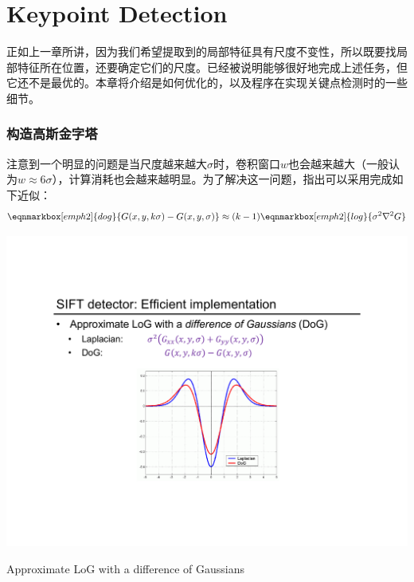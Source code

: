\part{Keypoint Detection}\label{part:Keypoint detection}

正如上一章所讲，因为我们希望提取到的局部特征具有尺度不变性，所以既要找局部特征所在位置，还要确定它们的尺度。\lpl 已经被说明能够很好地完成上述任务，但它还不是最优的。本章将介绍\sift 是如何优化的，以及程序在实现关键点检测时的一些细节。

\section{构造高斯金字塔}

\sift 注意到一个明显的问题是当\lpl 尺度越来越大$\sigma$时，卷积窗口$w$也会越来越大（一般认为$w\approx 6\sigma$），计算消耗也会越来越明显。为了解决这一问题，\sift 指出可以采用\DoG 完成如下近似：
\begin{equation}
	\eqnmarkbox[emph2]{dog}{G(x,y,k\sigma) - G(x,y,\sigma)} \approx (k-1)\eqnmarkbox[emph2]{log}{\sigma^2\nabla^2 G}
\end{equation}

\begin{marginfigure}
	\centering
	\includegraphics[width=\textwidth]{fig/Approximate LoG with a difference of Gaussians.pdf}
	\caption{Approximate LoG with a difference of Gaussians}
\end{marginfigure}

